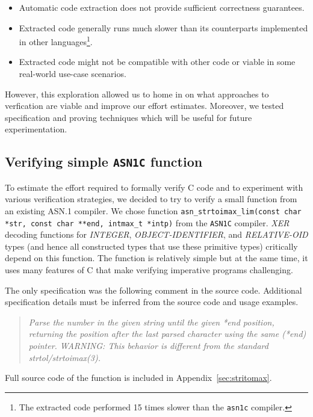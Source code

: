 \documentclass[10p,conference]{IEEEtran}
\begin{document}
\begin{itemize}
\item Automatic code extraction does not provide sufficient correctness guarantees.
\item Extracted code generally runs much slower than its counterparts implemented in other languages\footnote{The extracted code performed 15 times slower than the \texttt{asn1c} compiler.}.
\item Extracted code might not be compatible with other code or viable in some real-world use-case scenarios.
\end{itemize}

However, this exploration allowed us to home in on what approaches
to verfication are viable and improve our effort estimates. Moreover, we tested specification and proving techniques which will be useful for future experimentation.

\subsection{Verifying simple  \texttt{ASN1C} function}

To estimate the effort required to formally verify C code and to
experiment with various verification strategies, we decided to try to
verify a small function from an existing ASN.1 compiler. We chose
function \texttt{asn\_strtoimax\_lim(const char *str, const char
  **end, intmax\_t *intp)} from the \texttt{ASN1C} compiler. \emph{XER}
decoding functions for \emph{INTEGER}, \emph{OBJECT-IDENTIFIER}, and
\emph{RELATIVE-OID} types (and hence all constructed types that use
these primitive types) critically depend on this function. The
function is relatively simple but at the same time, it uses many features
of C that make verifying imperative programs challenging.

The only specification was the following comment in the
source code. Additional specification details must be inferred from
the source code and usage examples.

\begin{quote}
 { \it Parse the number in the given string until the given *end position,
 returning the position after the last parsed character using the
 same (*end) pointer.
 WARNING: This behavior is different from the standard strtol/strtoimax(3). }
\end{quote}

Full source code of the function is included in Appendix~\ref{sec:stritomax}.
\end{document}
